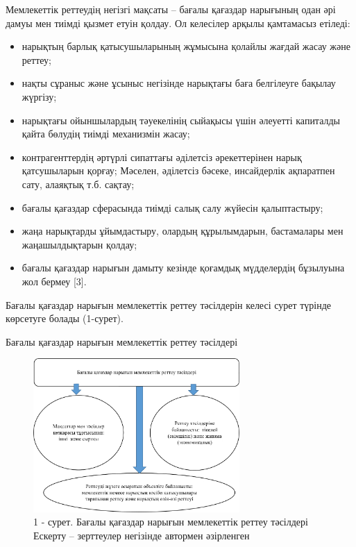 \begin{multicols}{2}
Мемлекеттік реттеудің негізгі мақсаты -- бағалы қағаздар нарығының одан
әрі дамуы мен тиімді қызмет етуін қолдау. Ол келесілер арқылы қамтамасыз
етіледі:

\begin{itemize}
\item
  нарықтың барлық қатысушыларының жұмысына қолайлы жағдай жасау және
  реттеу;
\item
  нақты сұраныс және ұсыныс негізінде нарықтағы баға белгілеуге бақылау
  жүргізу;
\item
  нарықтағы ойыншылардың тәуекелінің сыйақысы үшін әлеуетті капиталды
  қайта бөлудің тиімді механизмін жасау;
\item
  контрагенттердің әртүрлі сипаттағы әділетсіз әрекеттерінен нарық
  қатсушыларын қорғау; Мәселен, әділетсіз бәсеке, инсайдерлік ақпаратпен
  сату, алаяқтық т.б. сақтау;
\item
  бағалы қағаздар сферасында тиімді салық салу жүйесін қалыптастыру;
\item
  жаңа нарықтарды ұйымдастыру, олардың құрылымдарын, бастамалары мен
  жаңашылдықтарын қолдау;
\item
  бағалы қағаздар нарығын дамыту кезінде қоғамдық мүдделердің бұзылуына
  жол бермеу {[}3{]}.
\end{itemize}

Бағалы қағаздар нарығын мемлекеттік реттеу тәсілдерін келесі сурет
түрінде көрсетуге болады (1-сурет).

Бағалы қағаздар нарығын мемлекеттік реттеу тәсілдері
\end{multicols}

\begin{figure}[H]
	\centering
	\includegraphics[width=0.7\textwidth]{assets/340.1}
	\caption*{1 - сурет. Бағалы қағаздар нарығын мемлекеттік реттеу тәсілдері Ескерту -- зерттеулер негізінде автормен әзірленген}
\end{figure}

